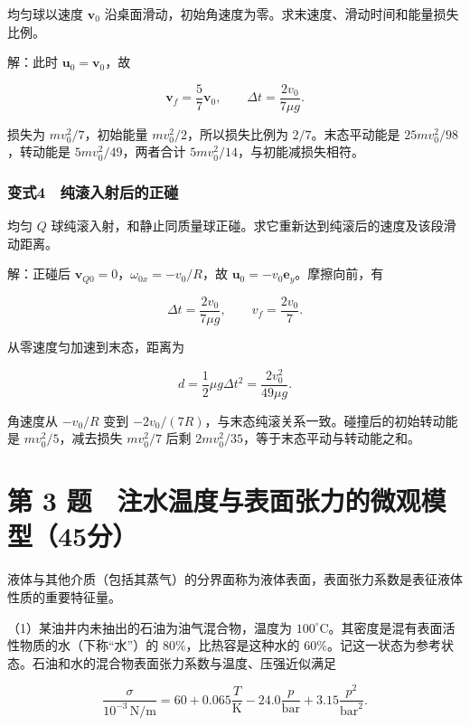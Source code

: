 \documentclass[12pt,a4paper,fontset=fandol]{ctexart}
\begin{document}
均匀球以速度 \(\boldsymbol v_0\)
沿桌面滑动，初始角速度为零。求末速度、滑动时间和能量损失比例。

解：此时 \(\boldsymbol u_0=\boldsymbol v_0\)，故

\[\boldsymbol v_f=\frac57\boldsymbol v_0,
\qquad\Delta t=\frac{2v_0}{7\mu g}.\]

损失为 \(mv_0^2/7\)，初始能量 \(mv_0^2/2\)，所以损失比例为
\(2/7\)。末态平动能是 \(25mv_0^2/98\)，转动能是 \(5mv_0^2/49\)，两者合计
\(5mv_0^2/14\)，与初能减损失相符。

\subsubsection{变式4　纯滚入射后的正碰}\label{ux53d8ux5f0f4-ux7eafux6edaux5165ux5c04ux540eux7684ux6b63ux78b0}

均匀 \(Q\)
球纯滚入射，和静止同质量球正碰。求它重新达到纯滚后的速度及该段滑动距离。

解：正碰后 \(\boldsymbol v_{Q0}=0\)，\(\omega_{0x}=-v_0/R\)，故
\(\boldsymbol u_0=-v_0\boldsymbol e_y\)。摩擦向前，有

\[\Delta t=\frac{2v_0}{7\mu g},
\qquad v_f=\frac{2v_0}{7}.\]

从零速度匀加速到末态，距离为

\[\boxed{d=\frac12\mu g\Delta t^2
=\frac{2v_0^2}{49\mu g}.}\]

角速度从 \(-v_0/R\) 变到
\(-2v_0/(7R)\)，与末态纯滚关系一致。碰撞后的初始转动能是
\(mv_0^2/5\)，减去损失 \(mv_0^2/7\) 后剩
\(2mv_0^2/35\)，等于末态平动与转动能之和。

\clearpage

\section{第 3
题　注水温度与表面张力的微观模型（45分）}\label{ux7b2c-3-ux9898-ux6ce8ux6c34ux6e29ux5ea6ux4e0eux8868ux9762ux5f20ux529bux7684ux5faeux89c2ux6a21ux578b45ux5206}

液体与其他介质（包括其蒸气）的分界面称为液体表面，表面张力系数是表征液体性质的重要特征量。

（1）某油井内未抽出的石油为油气混合物，温度为
\(100^\circ\mathrm C\)。其密度是混有表面活性物质的水（下称``水''）的
\(80\%\)，比热容是这种水的
\(60\%\)。记这一状态为参考状态。石油和水的混合物表面张力系数与温度、压强近似满足

\[\frac\sigma{10^{-3}\,\mathrm{N/m}}
=60+0.065\frac T{\mathrm K}
-24.0\frac p{\mathrm{bar}}
+3.15\frac{p^2}{\mathrm{bar}^2}.\]
\end{document}
